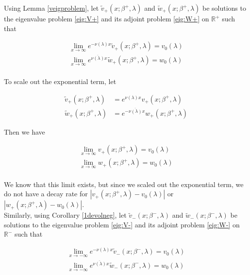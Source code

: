 \documentclass[12pt]{article}
\def\R{{\mathbb R}}
\begin{document}
Using Lemma \ref{veigproblem}, let $\tilde{v}_+(x; \beta^+, \lambda)$ and $\tilde{w}_+(x; \beta^+, \lambda)$ be solutions to the eigenvalue problem \eqref{eig:V+} and its adjoint problem \eqref{eig:W+} on $\R^+$ such that

\begin{align*}
\lim_{x \rightarrow \infty} e^{-\nu(\lambda) x} \tilde{v}_+(x; \beta^+, \lambda) = v_0(\lambda) \\
\lim_{x \rightarrow \infty} e^{\overline{\nu(\lambda)} x} \tilde{w}_+(x; \beta^+, \lambda) = w_0(\lambda) \\
\end{align*}

To scale out the exponential term, let

\begin{align}
\tilde{v}_+(x; \beta^+, \lambda) &= e^{\nu(\lambda) x } v_+(x; \beta^+, \lambda) \label{tildev+} \\
\tilde{w}_+(x; \beta^+, \lambda) &= e^{-\overline{\nu(\lambda)} x } w_+(x; \beta^+, \lambda) \label{tildew+} 
\end{align}

Then we have

\begin{align*}
\lim_{x \rightarrow \infty} v_+(x; \beta^+, \lambda) = v_0(\lambda) \\
\lim_{x \rightarrow \infty} w_+(x; \beta^+, \lambda) = w_0(\lambda) \\
\end{align*}

We know that this limit exists, but since we scaled out the exponential term, we do not have a decay rate for $|v_+(x; \beta^+, \lambda) - v_0(\lambda)|$ or $|w_+(x; \beta^+, \lambda) - w_0(\lambda)|$.\\

Similarly, using Corollary \ref{1devolneg}, let $\tilde{v}_-(x; \beta^-, \lambda)$ and $\tilde{w}_-(x; \beta^-, \lambda)$ be solutions to the eigenvalue problem \eqref{eig:V-} and its adjoint problem \eqref{eig:W-} on $\R^-$ such that

\begin{align*}
\lim_{x \rightarrow -\infty} e^{-\nu(\lambda) x} \tilde{v}_-(x; \beta^-, \lambda) = v_0(\lambda) \\
\lim_{x \rightarrow -\infty} e^{\overline{\nu(\lambda)} x} \tilde{w}_-(x; \beta^-, \lambda) = w_0(\lambda) \\
\end{align*}
\end{document}
